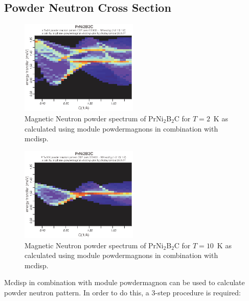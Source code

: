 \subsection{Powder Neutron Cross Section}


\begin{figure}[tb]%
\begin{center}\leavevmode
\includegraphics[angle=0, width=0.5\textwidth]{figsrc/contour2K_070504.eps}
\end{center}
\caption{Magnetic Neutron powder spectrum of PrNi$_2$B$_2$C for $T=2$~K as calculated using module {\prg powdermagnons} %
in combination with {\prg 
mcdisp}.}\label{prni2b2c_2K}
\end{figure}

\begin{figure}[tb]%
\begin{center}\leavevmode
\includegraphics[angle=0, width=0.5\textwidth]{figsrc/contour10K_070504.eps}
\end{center}
\caption{Magnetic Neutron powder spectrum of PrNi$_2$B$_2$C for $T=10$~K  as calculated using module {\prg %
powdermagnons} in combination with {\prg 
mcdisp}.}\label{prni2b2c_10K}
\end{figure}

{\prg Mcdisp} in combination with module {\prg powdermagnon} can be used to calculate
powder neutron pattern. In order to do this, a 3-step procedure is required:

